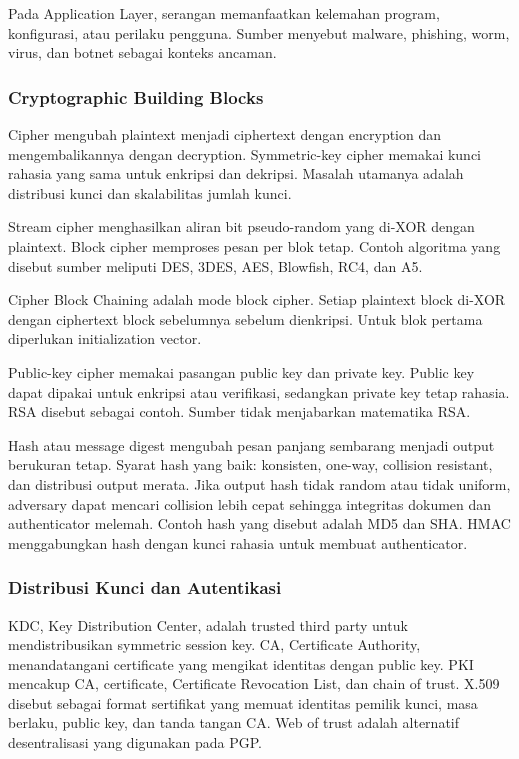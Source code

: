 Pada Application Layer, serangan memanfaatkan kelemahan program, konfigurasi, atau perilaku pengguna. Sumber menyebut malware, phishing, worm, virus, dan botnet sebagai konteks ancaman.

\subsubsection*{Cryptographic Building Blocks}

Cipher mengubah plaintext menjadi ciphertext dengan encryption dan mengembalikannya dengan decryption. Symmetric-key cipher memakai kunci rahasia yang sama untuk enkripsi dan dekripsi. Masalah utamanya adalah distribusi kunci dan skalabilitas jumlah kunci.

Stream cipher menghasilkan aliran bit pseudo-random yang di-XOR dengan plaintext. Block cipher memproses pesan per blok tetap. Contoh algoritma yang disebut sumber meliputi DES, 3DES, AES, Blowfish, RC4, dan A5.

Cipher Block Chaining adalah mode block cipher. Setiap plaintext block di-XOR dengan ciphertext block sebelumnya sebelum dienkripsi. Untuk blok pertama diperlukan initialization vector.

Public-key cipher memakai pasangan public key dan private key. Public key dapat dipakai untuk enkripsi atau verifikasi, sedangkan private key tetap rahasia. RSA disebut sebagai contoh. Sumber tidak menjabarkan matematika RSA.

Hash atau message digest mengubah pesan panjang sembarang menjadi output berukuran tetap. Syarat hash yang baik: konsisten, one-way, collision resistant, dan distribusi output merata. Jika output hash tidak random atau tidak uniform, adversary dapat mencari collision lebih cepat sehingga integritas dokumen dan authenticator melemah. Contoh hash yang disebut adalah MD5 dan SHA. HMAC menggabungkan hash dengan kunci rahasia untuk membuat authenticator.

\subsubsection*{Distribusi Kunci dan Autentikasi}

KDC, Key Distribution Center, adalah trusted third party untuk mendistribusikan symmetric session key. CA, Certificate Authority, menandatangani certificate yang mengikat identitas dengan public key. PKI mencakup CA, certificate, Certificate Revocation List, dan chain of trust. X.509 disebut sebagai format sertifikat yang memuat identitas pemilik kunci, masa berlaku, public key, dan tanda tangan CA. Web of trust adalah alternatif desentralisasi yang digunakan pada PGP.

